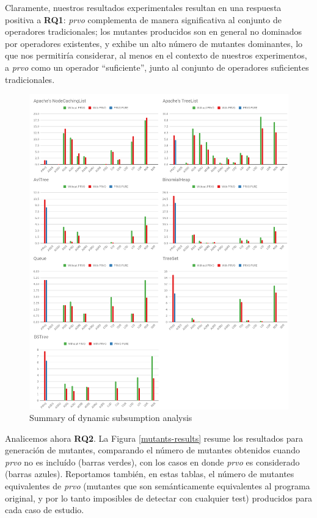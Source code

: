 Claramente, nuestros resultados experimentales resultan en una respuesta positiva a \textbf{RQ1}: \emph{prvo} complementa de manera significativa al conjunto de operadores tradicionales; los mutantes producidos son en general no dominados por operadores existentes, y exhibe un alto n\'umero de mutantes dominantes, lo que nos permitir\'ia considerar, al menos en el contexto de nuestros experimentos, a \emph{prvo} como un operador ``suficiente'', junto al conjunto de operadores suficientes tradicionales.

\begin{figure}[t]
	\begin{center}
		\includegraphics[width=12cm]{figures/Tables.png}
	\end{center}
	\caption{Summary of dynamic subsumption analysis}
	\label{subsumption-results}
\end{figure}

Analicemos ahora \textbf{RQ2}. La Figura \ref{mutants-results} resume los resultados para generaci\'on de mutantes, comparando el n\'umero de mutantes obtenidos cuando \emph{prvo} no es inclu\'ido (barras verdes), con los casos en donde \emph{prvo} es considerado (barras azules). Reportamos tambi\'en, en estas tablas, el n\'umero de mutantes equivalentes de \emph{prvo} (mutantes que son sem\'anticamente equivalentes al programa original, y por lo tanto imposibles de detectar con cualquier test) producidos para cada caso de estudio.

